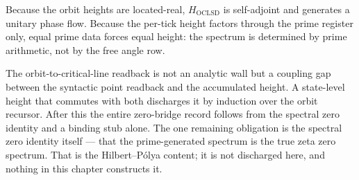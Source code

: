 \begin{principle}
\label{prin:rh-generation-self-adjoint}
Because the orbit heights are located-real, $H_{\mathrm{OCLSD}}$ is self-adjoint and
generates a unitary phase flow. Because the per-tick height factors through the
prime register only, equal prime data forces equal height: the spectrum is
determined by prime arithmetic, not by the free angle row.
\end{principle}

\begin{principle}
\label{prin:rh-generation-critical-coupling}
The orbit-to-critical-line readback is not an analytic wall but a coupling gap
between the syntactic point readback and the accumulated height. A state-level
height that commutes with both discharges it by induction over the orbit recursor.
After this the entire zero-bridge record follows from the spectral zero identity and
a binding stub alone. The one remaining obligation is the spectral zero identity
itself --- that the prime-generated spectrum is the true zeta zero spectrum. That is
the Hilbert--P\'olya content; it is not discharged here, and nothing in this chapter
constructs it.
\end{principle}

